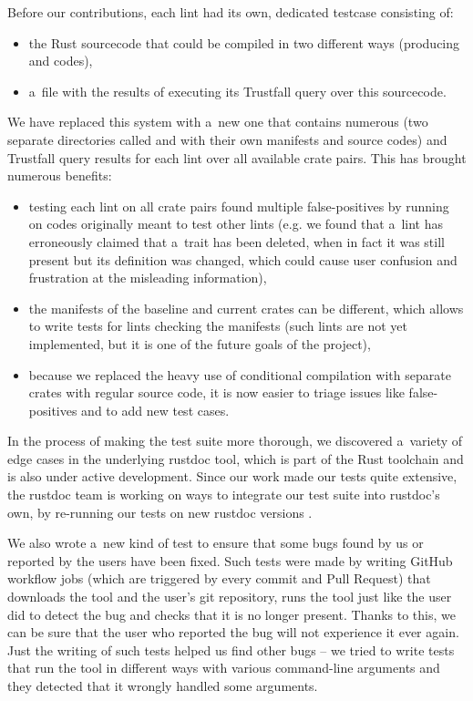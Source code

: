 \documentclass[licencjacka,en]{pracamgr}
\begin{document}
Before our contributions, each lint had its own, dedicated testcase consisting of:
\begin{itemize}
\item the Rust sourcecode that could be compiled in two different ways (producing
 and  codes),
\item a~file with the results of executing its Trustfall query over this sourcecode.
\end{itemize}
We have replaced this system with a~new one that contains numerous 
(two separate directories called  and  with their own
manifests and source codes) and Trustfall query results for each lint over all
available crate pairs. This has brought numerous benefits:
\begin{itemize}
	\item testing each lint on all crate pairs found multiple false-positives by running
		on codes originally meant to test other lints
		(e.g. we found that a~lint has erroneously claimed that a~trait
		has been deleted, when in fact it was still present but its definition
		was changed, which could cause user confusion and frustration at the
		misleading information),
	\item the manifests of the baseline and current crates can be different,
		which allows to write tests for lints checking the manifests
		(such lints are not yet implemented, but it is one of the future goals
		of the project),
	\item because we replaced the heavy use of conditional compilation with separate crates with regular source code,
	    it is now easier to triage issues like false-positives and to add new test cases.
\end{itemize}
In the process of making the test suite more thorough,
we discovered a~variety of edge cases in the underlying rustdoc tool,
which is part of the Rust toolchain and is also under active development.
Since our work made our tests quite extensive,
the rustdoc team is working on ways to integrate our test suite into rustdoc's own,
by re-running our tests on new rustdoc versions \cite{issue-rustdoc-our-tests}.

We also wrote a~new kind of test to ensure that some bugs found by us or reported by the users have been fixed.
Such tests were made by writing GitHub workflow jobs (which are triggered by every
commit and Pull Request) that downloads the tool and the user's git repository,
runs the tool just like the user did to detect the bug
and checks that it is no longer present.
Thanks to this, we can be sure that the user who reported the bug
will not experience it ever again.
Just the writing of such tests helped us find other bugs
-- we tried to write tests that run the tool in different ways
with various command-line arguments and they detected that it wrongly handled some arguments.
\end{document}
